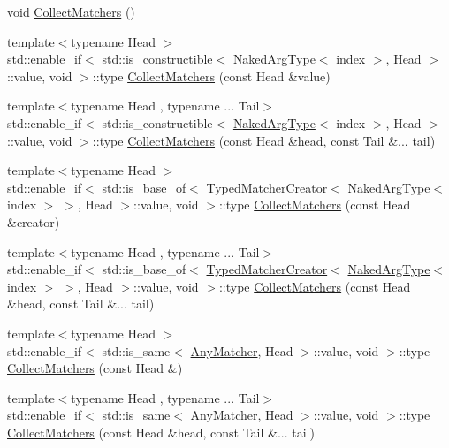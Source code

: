 \begin{DoxyCompactItemize}
\item 
void \mbox{\hyperlink{classfakeit_1_1MatchersCollector_a2d9a08a347c3915daa33f307a274f13c}{Collect\+Matchers}} ()
\item 
{\footnotesize template$<$typename Head $>$ }\\std\+::enable\+\_\+if$<$ std\+::is\+\_\+constructible$<$ \mbox{\hyperlink{classfakeit_1_1MatchersCollector_aeda8ced6a2f0cb7c6e4f916f18a91730}{Naked\+Arg\+Type}}$<$ index $>$, Head $>$\+::value, void $>$\+::type \mbox{\hyperlink{classfakeit_1_1MatchersCollector_affd243a89f758239d77c70dce6318087}{Collect\+Matchers}} (const Head \&value)
\item 
{\footnotesize template$<$typename Head , typename ... Tail$>$ }\\std\+::enable\+\_\+if$<$ std\+::is\+\_\+constructible$<$ \mbox{\hyperlink{classfakeit_1_1MatchersCollector_aeda8ced6a2f0cb7c6e4f916f18a91730}{Naked\+Arg\+Type}}$<$ index $>$, Head $>$\+::value, void $>$\+::type \mbox{\hyperlink{classfakeit_1_1MatchersCollector_a29c5245d03b8fab3773455c087edde74}{Collect\+Matchers}} (const Head \&head, const Tail \&... tail)
\item 
{\footnotesize template$<$typename Head $>$ }\\std\+::enable\+\_\+if$<$ std\+::is\+\_\+base\+\_\+of$<$ \mbox{\hyperlink{structfakeit_1_1TypedMatcherCreator}{Typed\+Matcher\+Creator}}$<$ \mbox{\hyperlink{classfakeit_1_1MatchersCollector_aeda8ced6a2f0cb7c6e4f916f18a91730}{Naked\+Arg\+Type}}$<$ index $>$ $>$, Head $>$\+::value, void $>$\+::type \mbox{\hyperlink{classfakeit_1_1MatchersCollector_ae954aa74286bcd096169067f5e897356}{Collect\+Matchers}} (const Head \&creator)
\item 
{\footnotesize template$<$typename Head , typename ... Tail$>$ }\\std\+::enable\+\_\+if$<$ std\+::is\+\_\+base\+\_\+of$<$ \mbox{\hyperlink{structfakeit_1_1TypedMatcherCreator}{Typed\+Matcher\+Creator}}$<$ \mbox{\hyperlink{classfakeit_1_1MatchersCollector_aeda8ced6a2f0cb7c6e4f916f18a91730}{Naked\+Arg\+Type}}$<$ index $>$ $>$, Head $>$\+::value, void $>$\+::type \mbox{\hyperlink{classfakeit_1_1MatchersCollector_a40994e9802e933fb1bae91870d666dcb}{Collect\+Matchers}} (const Head \&head, const Tail \&... tail)
\item 
{\footnotesize template$<$typename Head $>$ }\\std\+::enable\+\_\+if$<$ std\+::is\+\_\+same$<$ \mbox{\hyperlink{structfakeit_1_1AnyMatcher}{Any\+Matcher}}, Head $>$\+::value, void $>$\+::type \mbox{\hyperlink{classfakeit_1_1MatchersCollector_a89350af9ba2e7aaead8bd7b007f03631}{Collect\+Matchers}} (const Head \&)
\item 
{\footnotesize template$<$typename Head , typename ... Tail$>$ }\\std\+::enable\+\_\+if$<$ std\+::is\+\_\+same$<$ \mbox{\hyperlink{structfakeit_1_1AnyMatcher}{Any\+Matcher}}, Head $>$\+::value, void $>$\+::type \mbox{\hyperlink{classfakeit_1_1MatchersCollector_a5bc97a3d729b1bb67e372181ad88b77d}{Collect\+Matchers}} (const Head \&head, const Tail \&... tail)
\end{DoxyCompactItemize}


